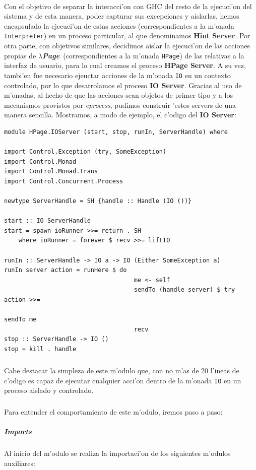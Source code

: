 \documentclass[a4paper]{article}
\newcommand{\hpage}{\textbf{\textsl{$\lambda$Page}}}
\begin{document}
\paragraph{}Con el objetivo de separar la interacci'on con GHC del resto de la ejecuci'on del sistema y de esta manera, poder capturar sus excepciones y aislarlas, hemos encapsulado la ejecuci'on de estas acciones (correspondientes a la m'onada \texttt{Interpreter}) en un proceso particular, al que denominamos \textbf{Hint Server}.  Por otra parte, con objetivos similares, decidimos aislar la ejecuci'on de las acciones propias de \hpage\ (correspondientes a la m'onada \texttt{HPage}) de las relativas a la interfaz de usuario, para lo cual creamos el proceso \textbf{HPage Server}.  A su vez, tambi'en fue necesario ejeuctar acciones de la m'onada \texttt{IO} en un contexto controlado, por lo que desarrolamos el proceso \textbf{IO Server}.  Gracias al uso de m'onadas, al hecho de que las acciones sean objetos de primer tipo y a los mecanismos provistos por \textsl{eprocess}, pudimos construir 'estos servers de una manera sencilla.   Mostramos, a modo de ejemplo, el c'odigo del \textbf{IO Server}:
\begin{center}\begin{lstlisting}
module HPage.IOServer (start, stop, runIn, ServerHandle) where

import Control.Exception (try, SomeException)
import Control.Monad
import Control.Monad.Trans
import Control.Concurrent.Process

newtype ServerHandle = SH {handle :: Handle (IO ())}

start :: IO ServerHandle
start = spawn ioRunner >>= return . SH
    where ioRunner = forever $ recv >>= liftIO

runIn :: ServerHandle -> IO a -> IO (Either SomeException a)
runIn server action = runHere $ do
                                    me <- self
                                    sendTo (handle server) $ try action >>=
                                                                    sendTo me
                                    recv
stop :: ServerHandle -> IO ()
stop = kill . handle
\end{lstlisting}\end{center}
\subparagraph{}Cabe destacar la simpleza de este m'odulo que, con no m'as de 20 l'ineas de c'odigo es capaz de ejecutar cualquier acci'on dentro de la m'onada \texttt{IO} en un proceso aislado y controlado.
\subparagraph{}Para entender el comportamiento de este m'odulo, iremos paso a paso:
\subparagraph{Imports} Al inicio del m'odulo se realiza la importaci'on de los siguientes m'odulos auxiliares:
\end{document}
